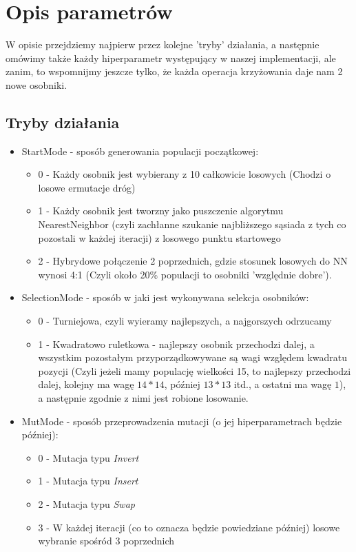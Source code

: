 \documentclass{article}
\begin{document}
\newpage
\section{Opis parametrów}
W opisie przejdziemy najpierw przez kolejne 'tryby' działania, a następnie omówimy także każdy hiperparametr występujący w naszej implementacji, ale zanim, to wspomnijmy jeszcze tylko, że każda operacja krzyżowania daje nam 2 nowe osobniki.

\subsection{Tryby działania}
\begin{itemize}
	\item StartMode - sposób generowania populacji początkowej:
		\begin{itemize}
			\item 0 - Każdy osobnik jest wybierany z 10 całkowicie losowych (Chodzi o losowe ermutacje dróg)
			\item 1 - Każdy osobnik jest tworzny jako puszczenie algorytmu NearestNeighbor (czyli zachłanne szukanie najbliższego sąsiada z tych co pozostali w każdej iteracji) z losowego punktu startowego
			\item 2 - Hybrydowe połączenie 2 poprzednich, gdzie stosunek losowych do NN wynosi 4:1 (Czyli około 20\% populacji to osobniki 'względnie dobre').
		\end{itemize}

	\item SelectionMode - sposób w jaki jest wykonywana selekcja osobników:
		\begin{itemize}
			\item 0 - Turniejowa, czyli wyieramy najlepszych, a najgorszych odrzucamy
			\item 1 - Kwadratowo ruletkowa - najlepszy osobnik przechodzi dalej, a wszystkim pozostałym przyporządkowywane są wagi względem kwadratu pozycji (Czyli jeżeli mamy populację wielkości 15, to najlepszy przechodzi dalej, kolejny ma wagę $14*14$, później $13*13$ itd., a ostatni ma wagę $1$), a następnie zgodnie z nimi jest robione losowanie.
		\end{itemize}

	\item MutMode - sposób przeprowadzenia mutacji (o jej hiperparametrach będzie później):
		\begin{itemize}
			\item 0 - Mutacja typu \textit{Invert}
			\item 1 - Mutacja typu \textit{Insert}
			\item 2 - Mutacja typu \textit{Swap}
			\item 3 - W każdej iteracji (co to oznacza będzie powiedziane później) losowe wybranie spośród 3 poprzednich
		\end{itemize}


\end{itemize}
\end{document}
